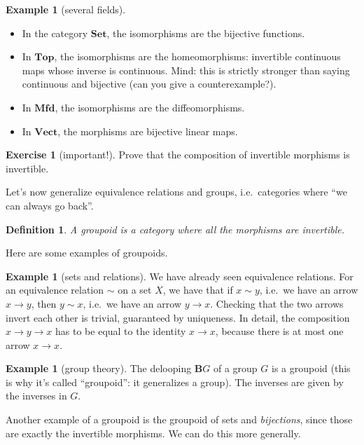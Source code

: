 \documentclass[12pt,oneside,headings=small]{scrbook}
\numberwithin{equation}{section}
\theoremstyle{plain}
\newtheorem{deph}[thm]{Definition}
\theoremstyle{definition}
\newtheorem{eg}[thm]{Example}
\newtheorem{ex}[thm]{Exercise}
\newcommand{\cat}[1]{{\mathbf{#1}}} %
\newcommand{\B}{\cat{B}} %
\newcommand{\Set}{\cat{Set}}
\newcommand{\Vect}{\cat{Vect}}
\DeclareMathOperator{\1}{\mathbbm{1}}
\DeclareMathOperator{\2}{\mathbbm{2}}
\begin{document}
\begin{eg}[several fields]
\phantom{newline}
 \begin{itemize}
  \item In the category $\Set$, the isomorphisms are the bijective functions.
  \item In $\cat{Top}$, the isomorphisms are the homeomorphisms: invertible continuous maps whose inverse is continuous. Mind: this is strictly stronger than saying continuous and bijective (can you give a counterexample?).
  \item In $\cat{Mfd}$, the isomorphisms are the diffeomorphisms.
  \item In $\Vect$, the morphisms are bijective linear maps.
 \end{itemize}
\end{eg}

\begin{ex}[important!]
 Prove that the composition of invertible morphisms is invertible.
\end{ex}

Let's now generalize equivalence relations and groups, i.e.~categories where ``we can always go back''.

\begin{deph}
 A \emph{groupoid} is a category where all the morphisms are invertible.
\end{deph}

Here are some examples of groupoids. 

\begin{eg}[sets and relations]
 We have already seen equivalence relations. For an equivalence relation $\sim$ on a set $X$, we have that if $x\sim y$, i.e.~we have an arrow $x\to y$, then $y\sim x$, i.e.~we have an arrow $y\to x$. Checking that the two arrows invert each other is trivial, guaranteed by uniqueness. In detail, the composition $x\to y \to x$ has to be equal to the identity $x\to x$, because there is at most one arrow $x\to x$.
\end{eg}

\begin{eg}[group theory]
 The delooping $\B G$ of a group $G$ is a groupoid (this is why it's called ``groupoid'': it generalizes a group). The inverses are given by the inverses in $G$.
\end{eg}

Another example of a groupoid is the groupoid of sets and \emph{bijections}, since those are exactly the invertible morphisms. We can do this more generally. 
\end{document}
